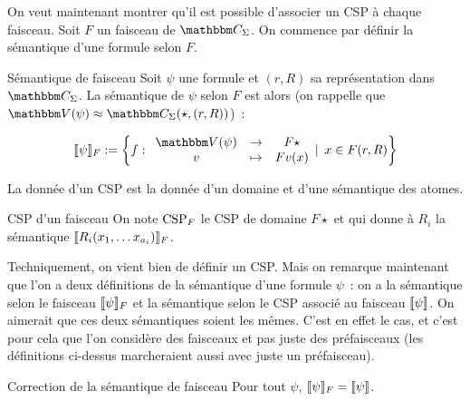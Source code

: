 On veut maintenant montrer qu'il est possible d'associer un CSP à chaque faisceau. Soit
$F$ un faisceau de $\C_\Sigma$. On commence par définir la sémantique d'une formule
selon $F$.

\begin{defi}{Sémantique de faisceau}
    Soit $\psi$ une formule et $(r,R)$ sa représentation dans $\C_\Sigma$. La sémantique
    de $\psi$ selon $F$ est alors (on rappelle que
    $\V(\psi)\approx\C_\Sigma(\star,(r,R))$)~:

    \[ \sem{\psi}_F := \left\{ f:\begin{array}{ccc}
            \V(\psi) & \rightarrow & F\star \\
            v        & \mapsto     & Fv(x) \\
    \end{array}\Large|~x\in F(r,R) \right\}\]
\end{defi}

La donnée d'un CSP est la donnée d'un domaine et d'une sémantique des atomes.

\begin{defi}{CSP d'un faisceau}
    On note $\text{CSP}_F$ le CSP de domaine $F\star$ et qui donne à
    $R_i$ la sémantique $\llbracket {R_i(x_1, \dots x_{a_i})} \rrbracket_F$.
\end{defi}

Techniquement, on vient bien de définir un CSP. Mais on remarque maintenant que l'on a
deux définitions de la sémantique d'une formule $\psi$~: on a la sémantique selon le
faisceau $\llbracket {\psi} \rrbracket_F$ et la sémantique selon le CSP associé au faisceau $\llbracket {\psi} \rrbracket$.
On aimerait que ces deux sémantiques soient les mêmes. C'est en effet le cas, et c'est pour
cela que l'on considère des faisceaux et pas juste des préfaisceaux (les définitions
ci-dessus marcheraient aussi avec juste un préfaisceau).

\begin{theo}{Correction de la sémantique de faisceau}
    Pour tout $\psi$, $\llbracket {\psi} \rrbracket_F = \llbracket {\psi} \rrbracket$.
\end{theo}

